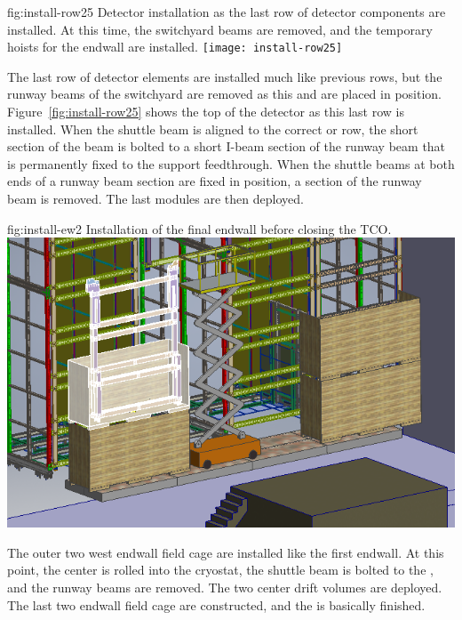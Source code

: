 \begin{dunefigure}{fig:install-row25}
  {Detector installation as the last row of detector components are installed. At this time, the switchyard beams are removed, and the temporary hoists for the endwall are installed.}
\texttt{[image: install-row25]}
\end{dunefigure}


The last row of detector elements are installed much like previous rows, but the runway beams of the  switchyard are removed as this  and  are placed in position. Figure~\ref{fig:install-row25} shows the top of the detector as this last row is installed. When the shuttle beam is aligned to the correct  or  row, the short section of the beam is bolted to a short I-beam section of the runway beam that is permanently fixed to the  support feedthrough. When the shuttle beams at both ends of a runway beam section are fixed in position, a section of the runway beam is removed. The last  modules are then deployed. 


\begin{dunefigure}{fig:install-ew2}
  {Installation of the final endwall before closing the TCO.}
\includegraphics[width=.9\textwidth]{graphics/install-ew2.png}
\end{dunefigure}

The outer two west endwall field cage are installed like the first endwall. At this point, the center  is rolled into the cryostat, the shuttle beam is bolted to the , and the runway beams are removed. The two center drift volumes  are deployed. The last two endwall field cage are constructed, and the  is basically finished. 

